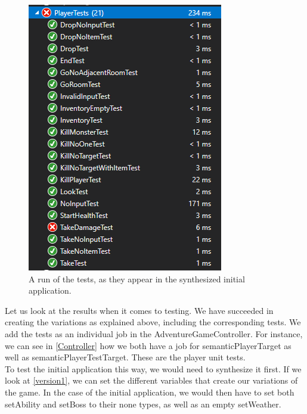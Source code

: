 \begin{figure}
	\centering
	\includegraphics[width=\linewidth]{Materials/Results/PlayerUnitTestsInitial}
	\caption{A run of the tests, as they appear in the synthesized initial application.}
	\label{PlayerUnitInit}
\end{figure} 
Let us look at the results when it comes to testing. We have succeeded in creating the variations as explained above, including the corresponding tests. We add the tests as an individual job in the AdventureGameController. For instance, we can see in \autoref{Controller} how we both have a job for semanticPlayerTarget as well as semanticPlayerTestTarget. These are the player unit tests. \\
To test the initial application this way, we would need to synthesize it first. If we look at \autoref{version1}, we can set the different variables that create our variations of the game. In the case of the initial application, we would then have to set both setAbility and setBoss to their none types, as well as an empty setWeather.
